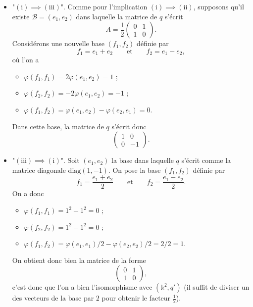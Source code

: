 \documentclass{../../td}
\begin{document}
\begin{enumerate}
\begin{itemize}
        \item "$(\text{i}) \implies (\text{iii})$".
          Comme pour l'implication $(\text{i}) \implies (\text{ii})$, supposons qu'il existe $\mathcal{B} = (e_1, e_2)$ dans laquelle la matrice de $q$ s'écrit \[
              A = \frac{1}{2}\begin{pmatrix} 0 & 1\\ 1 & 0 \end{pmatrix} 
          .\]
          Considérons une nouvelle base $(f_1, f_2)$ définie par \[
          f_1 = e_1 +e_2 \quad\quad \text{et}\quad\quad f_2 = e_1 - e_2
          ,\]
          où l'on a 
          \begin{itemize}
            \item $\varphi(f_1, f_1) = 2 \varphi(e_1, e_2) = 1$ ;
            \item $\varphi(f_2, f_2) = - 2 \varphi(e_1, e_2) = -1$ ;
            \item $\varphi(f_1, f_2) = \varphi(e_1, e_2) - \varphi(e_2, e_1) = 0$.
          \end{itemize}
          Dans cette base, la matrice de $q$ s'écrit donc \[
            \begin{pmatrix} 1 & 0\\ 0 & -1 \end{pmatrix} 
          .\]
        \item "$(\text{iii}) \implies (\text{i})$".
          Soit $(e_1,e_2)$ la base dans laquelle $q$ s'écrit comme la matrice diagonale $\mathrm{diag}(1, -1)$.
          On pose la base $(f_1, f_2)$ définie par \[
          f_1 = \frac{e_1 + e_2}{2} \quad\quad \text{et}\quad\quad f_2 = \frac{e_1 - e_2}{2}
          .\]
          On a donc 
          \begin{itemize}
            \item $\varphi(f_1, f_1) = 1^2 - 1^2 = 0$ ;
            \item $\varphi(f_2, f_2) = 1^2 - 1^2 = 0$ ;
            \item $\varphi(f_1, f_2) = \varphi(e_1,e_1) / 2 - \varphi(e_2, e_2) / 2 = 2 / 2 = 1$.
          \end{itemize}
          On obtient donc bien la matrice de la forme \[
            \begin{pmatrix} 0 & 1 \\ 1 & 0 \end{pmatrix} 
          ,\] c'est donc que l'on a bien l'isomorphisme avec $(\mathds{k}^2, q')$ (il suffit de diviser un des vecteurs de la base par $2$ pour obtenir le facteur $\frac{1}{2}$).

\end{itemize}
\end{enumerate}
\end{document}
